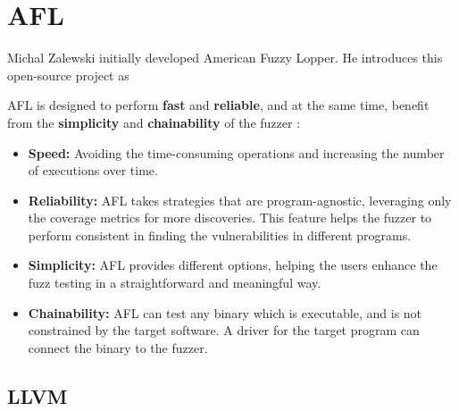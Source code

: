 \section{AFL} \label{sec:2.2}

Michal Zalewski initially developed American Fuzzy Lopper. He introduces this open-source project as  \cite{zalewski2014american}

AFL is designed to perform \textbf{fast} and \textbf{reliable}, and at the same time, benefit from the \textbf{simplicity} and \textbf{chainability} of the fuzzer \cite{about_afl}:

\begin{itemize}
    \item \textbf{Speed:} Avoiding the time-consuming operations and increasing the number of executions over time.
    \item \textbf{Reliability:} AFL takes strategies that are program-agnostic, leveraging only the coverage metrics for more discoveries. This feature helps the fuzzer to perform consistent in finding the vulnerabilities in different programs.
    \item \textbf{Simplicity:} AFL provides different options, helping the users enhance the fuzz testing in a straightforward and meaningful way. 
    \item \textbf{Chainability:} AFL can test any binary which is executable, and is not constrained by the target software. A driver for the target program can connect the binary to the fuzzer.
\end{itemize}

\subsection{LLVM} \label{sub:2.2.1}

 \cite{llvm,lattner2004llvm}

